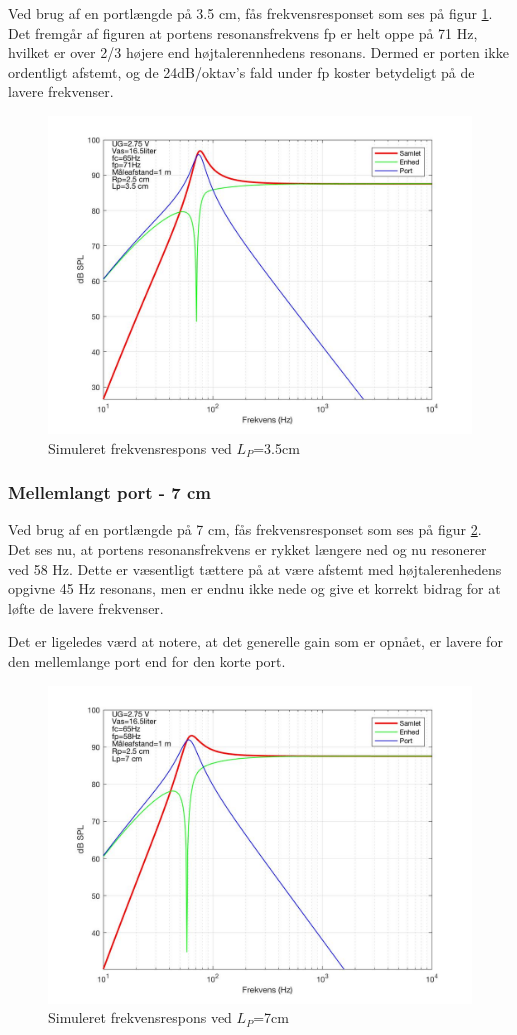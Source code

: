 Ved brug af en portlængde på 3.5 cm, fås frekvensresponset som ses på figur \ref{fig:sim_kort}. \\
Det fremgår af figuren at portens resonansfrekvens fp er helt oppe på 71 Hz, hvilket er over 2/3 højere end højtalerennhedens resonans. Dermed er porten ikke ordentligt afstemt, og de 24dB/oktav's fald under fp koster betydeligt på de lavere frekvenser. 

\begin{figure}[h!]
	\centering
	\includegraphics[width=.75\textwidth]{Pics/sim_kort}
	\caption{Simuleret frekvensrespons ved $L_P$=3.5cm } 
	\label{fig:sim_kort}
\end{figure}

\subsubsection{Mellemlangt port - 7 cm}

Ved brug af en portlængde på 7 cm, fås frekvensresponset som ses på figur \ref{fig:sim_medium}. \\
Det ses nu, at portens resonansfrekvens er rykket længere ned og nu resonerer ved 58 Hz. Dette er væsentligt tættere på at være afstemt med højtalerenhedens opgivne 45 Hz resonans, men er endnu ikke nede og give et korrekt bidrag for at løfte de lavere frekvenser. 

Det er ligeledes værd at notere, at det generelle gain som er opnået, er lavere for den mellemlange port end for den korte port.  

\begin{figure}[h!]
	\centering
	\includegraphics[width=.75\textwidth]{Pics/sim_medium}
	\caption{Simuleret frekvensrespons ved $L_P$=7cm } 
	\label{fig:sim_medium}
\end{figure}

